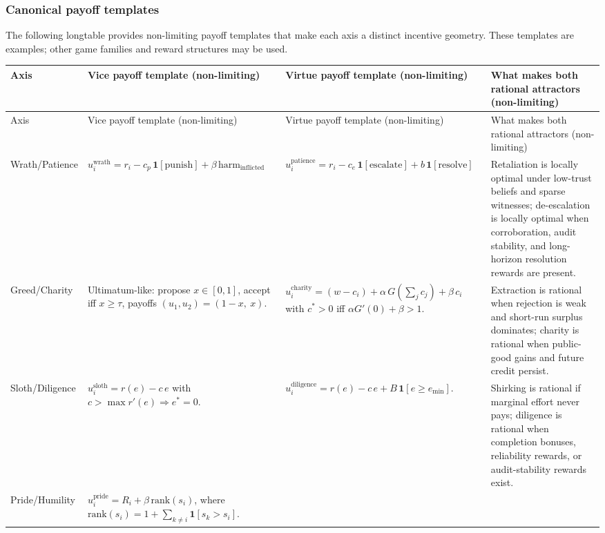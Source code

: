 \documentclass[a4paper,12pt]{article}
\begin{document}
\subsubsection{Canonical payoff templates}
\label{sec:payoff-templates}

The following longtable provides non-limiting payoff templates that
make each axis a distinct incentive geometry. These templates are
examples; other game families and reward structures may be used.

\begingroup
\footnotesize
\begin{longtable}{@{}p{}p{}p{}p{}@{}}
\toprule
Axis & Vice payoff template (non-limiting) & Virtue payoff template (non-limiting) & What makes both rational attractors (non-limiting) \\
\midrule
\endfirsthead
\toprule
Axis & Vice payoff template (non-limiting) & Virtue payoff template (non-limiting) & What makes both rational attractors (non-limiting) \\
\midrule
\endhead
Wrath/\allowbreak Patience &
$u_i^{\mathrm{wrath}} = r_i - c_p\,\mathbf{1}[\mathrm{punish}] + \beta\,\mathrm{harm}_{\mathrm{inflicted}}$ &
$u_i^{\mathrm{patience}} = r_i - c_e\,\mathbf{1}[\mathrm{escalate}] + b\,\mathbf{1}[\mathrm{resolve}]$ &
Retaliation is locally optimal under low-trust beliefs and sparse witnesses; de-escalation is locally optimal when corroboration, audit stability, and long-horizon resolution rewards are present. \\
Greed/\allowbreak Charity &
Ultimatum-like: propose $x\in[0,1]$, accept iff $x\ge\tau$, payoffs $(u_1,u_2)=(1-x,\ x)$. &
$u_i^{\mathrm{charity}} = (w-c_i) + \alpha\,G(\sum_j c_j) + \beta\,c_i$ with $c^*>0$ iff $\alpha G'(0)+\beta>1$. &
Extraction is rational when rejection is weak and short-run surplus dominates; charity is rational when public-good gains and future credit persist. \\
Sloth/\allowbreak Diligence &
$u_i^{\mathrm{sloth}} = r(e)-c\,e$ with $c>\max r'(e)\Rightarrow e^*=0$. &
$u_i^{\mathrm{diligence}} = r(e)-c\,e + B\,\mathbf{1}[e\ge e_{\min}]$. &
Shirking is rational if marginal effort never pays; diligence is rational when completion bonuses, reliability rewards, or audit-stability rewards exist. \\
Pride/\allowbreak Humility &
$u_i^{\mathrm{pride}} = R_i + \beta\,\mathrm{rank}(s_i)$, where $\mathrm{rank}(s_i)=1+\sum_{k\ne i}\mathbf{1}[s_k>s_i]$. &

\end{longtable}
\end{document}
